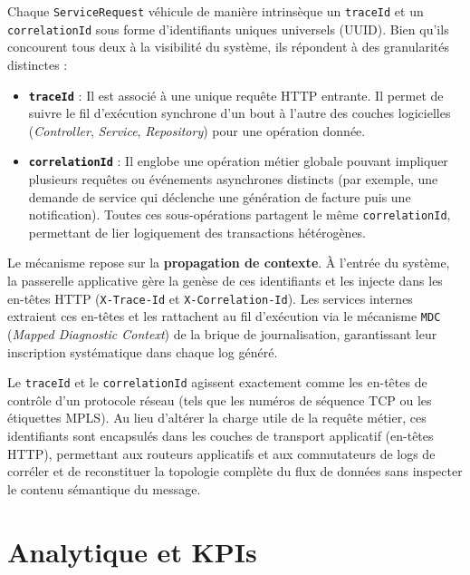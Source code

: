 Chaque \texttt{ServiceRequest} véhicule de manière intrinsèque un \texttt{traceId} et un \texttt{correlationId} sous forme d'identifiants uniques universels (UUID). Bien qu'ils concourent tous deux à la visibilité du système, ils répondent à des granularités distinctes :
\begin{itemize}
    \item \textbf{\texttt{traceId}} : Il est associé à une unique requête HTTP entrante. Il permet de suivre le fil d'exécution synchrone d'un bout à l'autre des couches logicielles (\emph{Controller}, \emph{Service}, \emph{Repository}) pour une opération donnée.
    \item \textbf{\texttt{correlationId}} : Il englobe une opération métier globale pouvant impliquer plusieurs requêtes ou événements asynchrones distincts (par exemple, une demande de service qui déclenche une génération de facture puis une notification). Toutes ces sous-opérations partagent le même \texttt{correlationId}, permettant de lier logiquement des transactions hétérogènes.
\end{itemize}

Le mécanisme repose sur la \textbf{propagation de contexte}. À l'entrée du système, la passerelle applicative gère la genèse de ces identifiants et les injecte dans les en-têtes HTTP (\texttt{X-Trace-Id} et \texttt{X-Correlation-Id}). Les services internes extraient ces en-têtes et les rattachent au fil d'exécution via le mécanisme \texttt{MDC} (\emph{Mapped Diagnostic Context}) de la brique de journalisation, garantissant leur inscription systématique dans chaque log généré.

\begin{analogie}
Le \texttt{traceId} et le \texttt{correlationId} agissent exactement comme les en-têtes de contrôle d'un protocole réseau (tels que les numéros de séquence TCP ou les étiquettes MPLS). Au lieu d'altérer la charge utile de la requête métier, ces identifiants sont encapsulés dans les couches de transport applicatif (en-têtes HTTP), permettant aux routeurs applicatifs et aux commutateurs de logs de corréler et de reconstituer la topologie complète du flux de données sans inspecter le contenu sémantique du message.
\end{analogie}

\section{Analytique et KPIs}

